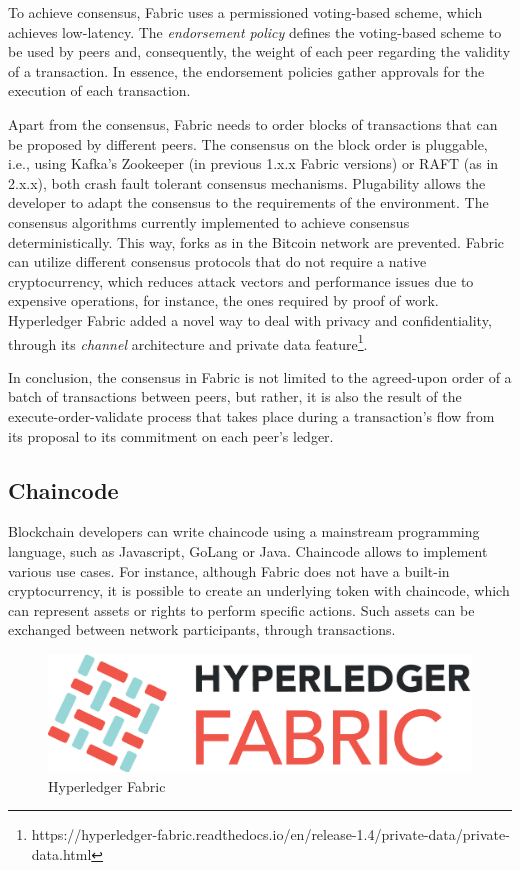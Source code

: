 \documentclass[12pt,a4paper]{article}
\theoremstyle{definition}
\begin{document}
To achieve consensus, Fabric uses a permissioned voting-based scheme, which achieves low-latency. The \emph{endorsement policy} defines the voting-based scheme to be used by peers and, consequently, the weight of each peer regarding the validity of a transaction. In essence, the endorsement policies gather approvals for the execution of each transaction.

Apart from the consensus, Fabric needs to order blocks of transactions that can be proposed by different peers. The consensus on the block order is pluggable, i.e., using Kafka's Zookeeper (in previous 1.x.x Fabric versions) or RAFT (as in 2.x.x), both crash fault tolerant consensus mechanisms. Plugability allows the developer to adapt the consensus to the requirements of the environment. The consensus algorithms currently implemented to achieve consensus deterministically. This way, forks as in the Bitcoin network are prevented. Fabric can utilize different consensus protocols that do not require a native cryptocurrency, which reduces attack vectors and performance issues due to expensive operations, for instance, the ones required by proof of work. 
Hyperledger Fabric added a novel way to deal with privacy and confidentiality, through its \textit{channel} architecture and private data feature\footnote{https://hyperledger-fabric.readthedocs.io/en/release-1.4/private-data/private-data.html}.

In conclusion, the consensus in Fabric is not limited to the agreed-upon order of a batch of transactions between peers, but rather, it is also the result of the execute-order-validate process that takes place during a transaction's flow from its proposal to its commitment on each peer's ledger. 

\subsection{Chaincode}

Blockchain developers can write chaincode using a mainstream programming language, such as Javascript, GoLang or Java. Chaincode allows to implement various use cases. For instance, although Fabric does not have a built-in cryptocurrency, it is possible to create an underlying token with chaincode, which can represent assets or rights to perform specific actions. Such assets can be exchanged between network participants, through transactions. 



\begin{figure}[h]

    \includegraphics[scale=0.6]{figures/hf.png}
    \centering
 \caption{Hyperledger Fabric}
    \label{fig:hf}
\end{figure}
\end{document}
